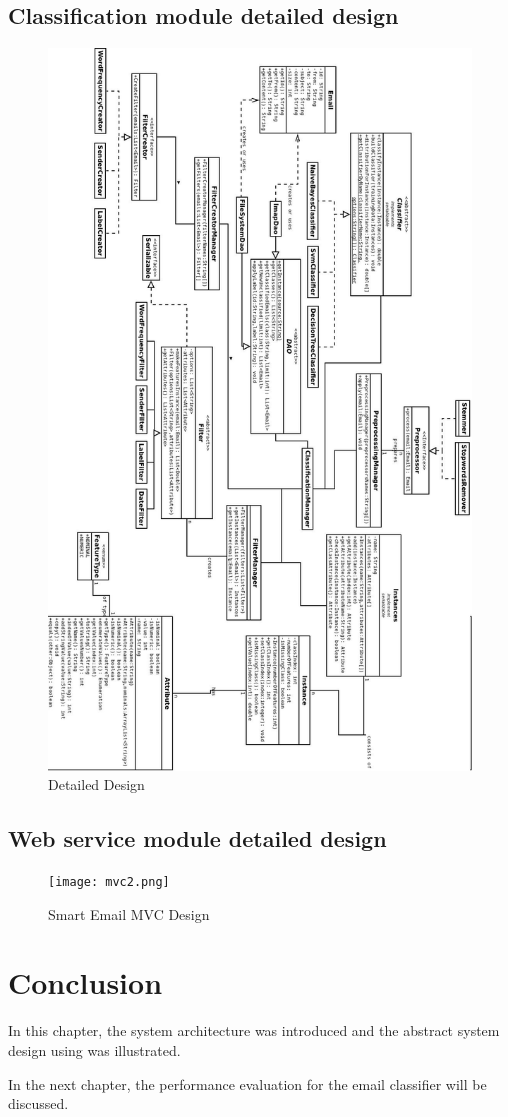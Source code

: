 \subsection{Classification module detailed design}
\begin{figure}[H]
  \centering
  \includegraphics[width=12cm]{design.jpeg}
  \caption[Detailed Design] {Detailed Design}
\end{figure}



\subsection{Web service module detailed design}
\begin{figure}[H]
  \centering
  \texttt{[image: mvc2.png]}
  \caption[Smart Email MVC Design]{Smart Email MVC Design}
\end{figure}


\section{Conclusion}
In this chapter, the system architecture was introduced and the abstract system design using was illustrated.

In the next chapter, the performance evaluation for the email classifier will be discussed.
